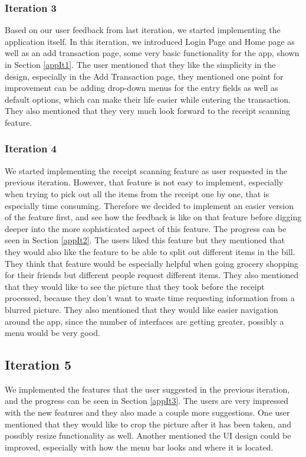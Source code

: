 \documentclass[a4wide, 11pt]{article}
\begin{document}
\subsubsection{Iteration 3}
Based on our user feedback from last iteration, we started implementing the application itself.
In this iteration, we introduced Login Page and Home page as well as an add transaction page, some very basic functionality for the app, shown in Section \ref{appIt1}. The user mentioned that they like the simplicity in the design, especially in the Add Transaction page, they mentioned one point for improvement can be adding drop-down menus for the entry fields as well as default options, which can make their life easier while entering the transaction. They also mentioned that they very much look forward to the receipt scanning feature.

\subsubsection{Iteration 4}
We started implementing the receipt scanning feature as user requested in the previous iteration. However, that feature is not easy to implement, especially when trying to pick out all the items from the receipt one by one, that is especially time consuming. Therefore we decided to implement an easier version of the feature first, and see how the feedback is like on that feature before digging deeper into the more sophisticated aspect of this feature. The progress can be seen in Section \ref{appIt2}. The users liked this feature but they mentioned that they would also like the feature to be able to split out different items in the bill. They think that feature would be especially helpful when going grocery shopping for their friends but different people request different items. They also mentioned that they would like to see the picture that they took before the receipt processed, because they don't want to waste time requesting information from a blurred picture. They also mentioned that they would like easier navigation around the app, since the number of interfaces are getting greater, possibly a menu would be very good.

\subsection{Iteration 5}
We implemented the features that the user suggested in the previous iteration, and the progress can be seen in Section \ref{appIt3}. The users are very impressed with the new features and they also made a couple more suggestions. One user mentioned that they would like to crop the picture after it has been taken, and possibly resize functionality as well. Another mentioned the UI design could be improved, especially with how the menu bar looks and where it is located.
\end{document}
